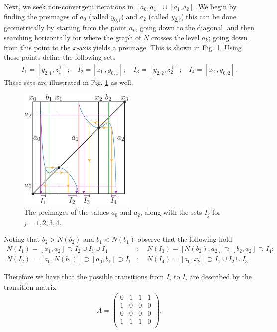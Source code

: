 \begin{ex}
Next, we seek non-convergent iterations in $[a_0, a_1] \cup [a_1, a_2]$. We begin by finding the preimages of $a_0$ (called $y_{0,i}$) and $a_2 $ (called $y_{2,i}$) this can be done geometrically by starting from the point $a_k$, going down to the diagonal, and then searching horizontally for where the graph of $N$ crosses the level $a_k$; going down from this point to the $x$-axis yields a preimage. This is shown in Fig. \ref{fig:NR_preimages}. Using these points define the following sets
\begin{align}
	I_{1} = [y_{2,1}, z_{1}^{+}];\quad
	I_{2} = [z_{1}^{-}, y_{0,1}];\quad
	I_{3} = [y_{2,2}, z_{2}^{+}];\quad
	I_{4} = [z_{2}^{-}, y_{0,2}].
\end{align}
These sets are illustrated in Fig. \ref{fig:NR_preimages} as well.
\begin{figure}[h!]
	\centering
	\includegraphics[width=0.5\textwidth]{figures/ch7/4NR_preimages.pdf}
	\caption{The preimages of the values $a_0$ and $a_2$, along with the sets $I_{j}$ for $j=1,2,3,4$.}
	\label{fig:NR_preimages}
\end{figure}

Noting that $b_2 > N(b_2)$ and $b_1 < N(b_1)$ observe that the following hold
\begin{subequations}
\begin{align}
	N(I_1) = [x_1, a_2] \supset I_2 \cup I_3 \cup I_4&; \quad	
	N(I_3) = [N(b_2), a_2] \supset [b_2, a_2] \supset I_4;\\
	N(I_2) = [a_0, N(b_1)] \supset [a_0, b_1] \supset I_1&;\quad
	N(I_4) = [a_0, x_2] \supset I_1 \cup I_2 \cup I_3.
\end{align}
\end{subequations}
\end{ex}
Therefore we have that the possible transitions from $I_{i}$ to $I_{j}$ are described by the transition matrix
\begin{align}
	A = 
	\begin{pmatrix}
		0 & 1 & 1 & 1 \\
		1 & 0 & 0 & 0 \\
		0 & 0 & 0 & 0 \\
		1 & 1 & 1 & 0 \\
	\end{pmatrix}
.	
\end{align}
